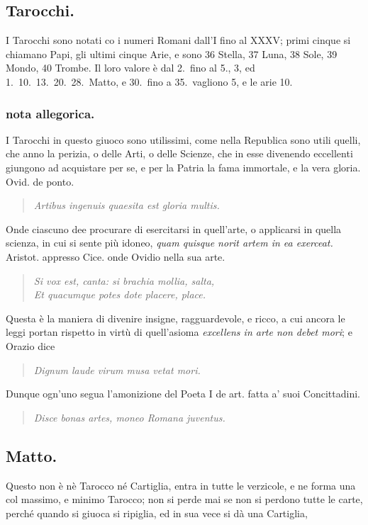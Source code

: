 \documentclass[11pt,a6paper]{article}
\newcommand{\literaryquote}[1]{%
\kern -6pt  \begin{verse}
    {\footnotesize \it #1}
  \end{verse}\kern -2pt%
}
\begin{document}
\subsection{Tarocchi.}

I Tarocchi sono notati co i numeri Romani
dall'I fino al XXXV; primi cinque si chiamano
Papi, gli ultimi cinque Arie, e sono
36 Stella, 37 Luna, 38 Sole, 39 Mondo,
40 Trombe. Il loro valore è dal 2.\ fino al 5., 3,
ed 1.\ 10.\ 13.\ 20.\ 28.\ Matto, e 30.\ fino a
35.\ vagliono 5, e le arie 10.

\subsubsection{nota allegorica.}
{\footnotesize
I Tarocchi in questo giuoco sono utilissimi,
come nella Republica sono utili quelli, che anno la
perizia, o delle Arti, o delle Scienze, che in esse
divenendo eccellenti giungono ad acquistare per se,
e per la Patria la fama immortale, e la vera gloria.
Ovid. de ponto.

\literaryquote{Artibus ingenuis quaesita est gloria multis.}

Onde ciascuno dee procurare di esercitarsi in
quell'arte, o applicarsi in quella scienza, in cui
si sente
più idoneo, \textit{quam quisque norit artem in ea
 exerceat.} Aristot. appresso Cice. onde Ovidio
nella sua arte.

\literaryquote{Si vox est, canta: si brachia mollia, salta,\\
 Et quacumque potes dote placere, place.}

Questa è la maniera di divenire insigne, ragguardevole,
e ricco, a cui ancora le leggi portan rispetto
in virtù di quell'asioma \textit{excellens in arte non debet
mori}; e Orazio dice

\literaryquote{Dignum laude virum musa vetat mori.}

Dunque ogn'uno segua l'amonizione del Poeta I
de art. fatta a' suoi Concittadini.

\literaryquote{Disce bonas artes, moneo Romana juventus.}

}
\subsection{Matto.}

Questo non è nè Tarocco né Cartiglia,
entra in tutte le verzicole, e ne forma
una col massimo, e minimo Tarocco;
non si perde mai se non si perdono
tutte le carte, perché quando si giuoca si
ripiglia, ed in sua vece si dà una Cartiglia,
\end{document}
